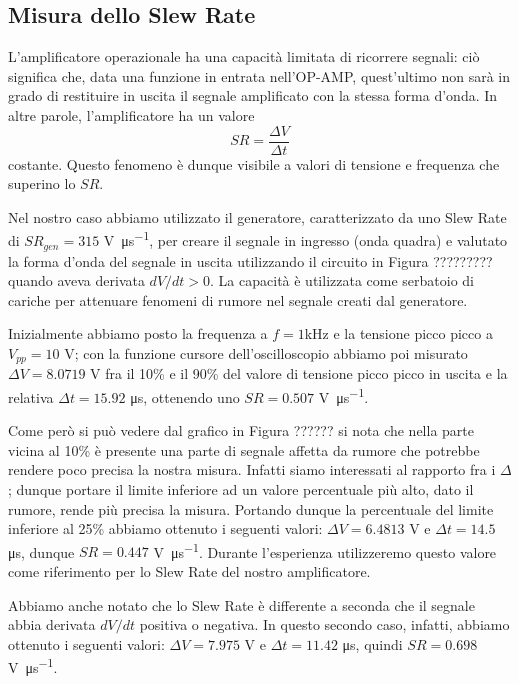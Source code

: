 \subsection{Misura dello Slew Rate}

L'amplificatore operazionale ha una capacità limitata di ricorrere segnali: ciò significa che, data una funzione in entrata nell'OP-AMP, quest'ultimo non sarà in grado di restituire in uscita il segnale amplificato con la stessa forma d'onda. In altre parole, l'amplificatore ha un valore
$$SR = \frac{\Delta V}{\Delta t}$$
costante. Questo fenomeno è dunque visibile a valori di tensione e frequenza che superino lo $SR$.

Nel nostro caso abbiamo utilizzato il generatore, caratterizzato da uno Slew Rate di $SR_{gen}=315$ \si{\volt\per\micro\second}, per creare il segnale in ingresso (onda quadra) e valutato la forma d'onda del segnale in uscita utilizzando il circuito in Figura ????????? quando aveva derivata $dV/dt > 0$. La capacità è utilizzata come serbatoio di cariche per attenuare fenomeni di rumore nel segnale creati dal generatore.

Inizialmente abbiamo posto la frequenza a $f=1$\si{\kilo\hertz} e la tensione picco picco a $V_{pp}=10$ \si{\volt}; con la funzione cursore dell'oscilloscopio abbiamo poi misurato $\Delta V = 8.0719$ \si{\volt} fra il 10\% e il 90\% del valore di tensione picco picco in uscita e la relativa $\Delta t = 15.92$ \si{\micro\second}, ottenendo uno $SR=0.507$ \si{\volt\per\micro\second}.

Come però si può vedere dal grafico in Figura ?????? si nota che nella parte vicina al 10\% è presente una parte di segnale affetta da rumore che potrebbe rendere poco precisa la nostra misura. Infatti siamo interessati al rapporto fra i $\Delta$; dunque portare il limite inferiore ad un valore percentuale più alto, dato il rumore, rende più precisa la misura. Portando dunque la percentuale del limite inferiore al 25\% abbiamo ottenuto i seguenti valori: $\Delta V = 6.4813$ \si{\volt} e $\Delta t = 14.5$ \si{\micro\second}, dunque $SR = 0.447$ \si{\volt\per\micro\second}. Durante l'esperienza utilizzeremo questo valore come riferimento per lo Slew Rate del nostro amplificatore.

Abbiamo anche notato che lo Slew Rate è differente a seconda che il segnale abbia derivata $dV/dt$ positiva o negativa. In questo secondo caso, infatti, abbiamo ottenuto i seguenti valori: $\Delta V = 7.975$ \si{\volt} e $\Delta t = 11.42$ \si{\micro\second}, quindi $SR = 0.698$ \si{\volt\per\micro\second}.